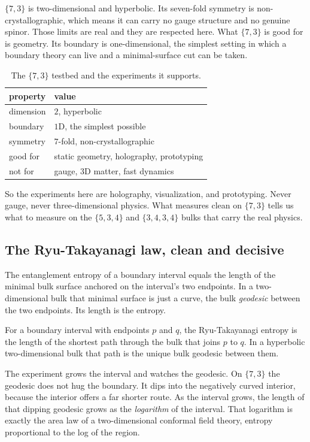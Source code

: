$\{7,3\}$ is two-dimensional and hyperbolic. Its seven-fold symmetry is non-crystallographic, which means it can carry no gauge structure and no genuine spinor. Those limits are real and they are respected here. What $\{7,3\}$ is good for is geometry. Its boundary is one-dimensional, the simplest setting in which a boundary theory can live and a minimal-surface cut can be taken.

\begin{table}[ht]
\centering
\begin{tabular}{@{}ll@{}}
\toprule
property & value \\
\midrule
dimension & $2$, hyperbolic \\
boundary & $1$D, the simplest possible \\
symmetry & $7$-fold, non-crystallographic \\
good for & static geometry, holography, prototyping \\
not for & gauge, $3$D matter, fast dynamics \\
\bottomrule
\end{tabular}
\caption{The $\{7,3\}$ testbed and the experiments it supports.}
\label{tab:hol-testbed}
\end{table}

So the experiments here are holography, visualization, and prototyping. Never gauge, never three-dimensional physics. What measures clean on $\{7,3\}$ tells us what to measure on the $\{5,3,4\}$ and $\{3,4,3,4\}$ bulks that carry the real physics.

\subsection{The Ryu-Takayanagi law, clean and decisive}

The entanglement entropy of a boundary interval equals the length of the minimal bulk surface anchored on the interval's two endpoints. In a two-dimensional bulk that minimal surface is just a curve, the bulk \emph{geodesic} between the two endpoints. Its length is the entropy.

\begin{definition}
For a boundary interval with endpoints $p$ and $q$, the Ryu-Takayanagi entropy is the length of the shortest path through the bulk that joins $p$ to $q$. In a hyperbolic two-dimensional bulk that path is the unique bulk geodesic between them.
\end{definition}

The experiment grows the interval and watches the geodesic. On $\{7,3\}$ the geodesic does not hug the boundary. It dips into the negatively curved interior, because the interior offers a far shorter route. As the interval grows, the length of that dipping geodesic grows as the \emph{logarithm} of the interval. That logarithm is exactly the area law of a two-dimensional conformal field theory, entropy proportional to the log of the region.

